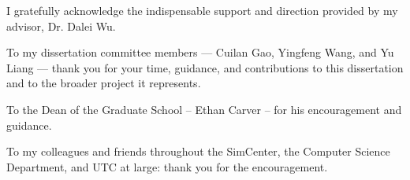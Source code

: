 %

I gratefully acknowledge the indispensable support and direction provided by my advisor, Dr. Dalei Wu.

To my dissertation committee members — Cuilan Gao, Yingfeng Wang, and Yu Liang —
thank you for your time, guidance, and contributions to this dissertation and to the broader project it represents.

To the Dean of the Graduate School  -- Ethan Carver -- for his encouragement and guidance.

To my colleagues and friends throughout the SimCenter, the Computer Science Department, and UTC at large: thank you for the encouragement.
